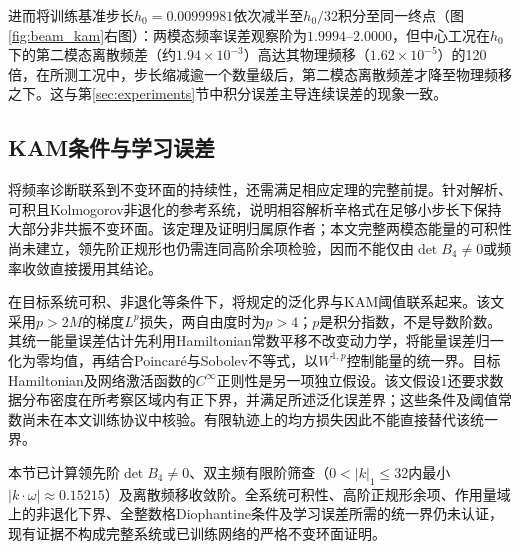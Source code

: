 进而将训练基准步长$h_0=0.00999981$依次减半至$h_0/32$积分至同一终点（图\ref{fig:beam_kam}右图）：两模态频率误差观察阶为$1.9994$--$2.0000$，但中心工况在$h_0$下的第二模态离散频差（约$1.94\times10^{-3}$）高达其物理频移（$1.62\times10^{-5}$）的120倍，在所测工况中，步长缩减逾一个数量级后，第二模态离散频差才降至物理频移之下。这与第\ref{sec:experiments}节中积分误差主导连续误差的现象一致。

\subsection{KAM条件与学习误差}

将频率诊断联系到不变环面的持续性，还需满足相应定理的完整前提。\citet[定理1]{Shang1999}针对解析、可积且Kolmogorov非退化的参考系统，说明相容解析辛格式在足够小步长下保持大部分非共振不变环面。该定理及证明归属原作者；本文完整两模态能量的可积性尚未建立，领先阶正规形也仍需连同高阶余项检验，因而不能仅由$\det B_4\neq0$或频率收敛直接援用其结论。

\citet[定理11，假设2--5]{Chen2022}在目标系统可积、非退化等条件下，将规定的泛化界与KAM阈值联系起来。该文采用$p>2M$的梯度$L^p$损失，两自由度时为$p>4$；$p$是积分指数，不是导数阶数。其统一能量误差估计先利用Hamiltonian常数平移不改变动力学，将能量误差归一化为零均值，再结合Poincaré与Sobolev不等式，以$W^{1,p}$控制能量的统一界。目标Hamiltonian及网络激活函数的$C^\infty$正则性是另一项独立假设。该文假设1还要求数据分布密度在所考察区域内有正下界，并满足所述泛化误差界；这些条件及阈值常数尚未在本文训练协议中核验。有限轨迹上的均方损失因此不能直接替代该统一界。

本节已计算领先阶$\det B_4\neq0$、双主频有限阶筛查（$0<|k|_1\leq32$内最小$|k\cdot\omega|\approx0.15215$）及离散频移收敛阶。全系统可积性、高阶正规形余项、作用量域上的非退化下界、全整数格Diophantine条件及学习误差所需的统一界仍未认证，现有证据不构成完整系统或已训练网络的严格不变环面证明。
